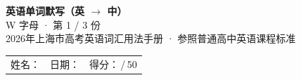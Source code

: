 \documentclass[10pt,a4paper]{article}
\begin{document}
\pagestyle{plain}

\begin{center}
{\LARGE\bfseries 英语单词默写（英 $\to$ 中）}\\[0.22em]
{\large W 字母 · 第 1 / 3 份}\\[0.18em]
{\small 2026年上海市高考英语词汇用法手册 · 参照普通高中英语课程标准}
\end{center}

\vspace{0.25em}
\noindent\begin{tabular}{@{}p{}@{}p{}@{}p{}@{}}
姓名：\underline{\hspace{2.0cm}} & 日期：\underline{\hspace{2.0cm}} & 得分：\underline{\hspace{1.3cm}}\,/\,50 \\
\end{tabular}

\vspace{0.3em}

\vspace{0.08em}
\end{document}
